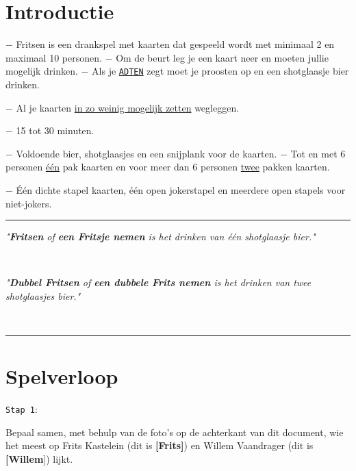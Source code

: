 \section*{Introductie}
$-$ Fritsen is een drankspel met kaarten dat gespeeld wordt met minimaal 2 en maximaal 10 personen. \newline $-$ Om de beurt leg je een kaart neer en moeten jullie mogelijk drinken. \newline $-$ Als je \ul{\texttt{ADTEN}} zegt moet je proosten op  en een shotglaasje bier drinken. 
\vspace*{-0.22cm} 

$-$ Al je kaarten \ul{in zo weinig mogelijk zetten} wegleggen.

\vspace*{-0.22cm} 

$-$ 15 tot 30 minuten.

\vspace*{-0.22cm} 

$-$ Voldoende bier, shotglaasjes en een snijplank voor de kaarten. \newline $-$ Tot en met 6 personen \ul{\'e\'en} pak kaarten en voor meer dan 6 personen \ul{twee} pakken kaarten.

\vspace*{-0.22cm} 

$-$ \'E\'en dichte stapel kaarten, \'e\'en open jokerstapel en meerdere open stapels voor niet-jokers.

\noindent\rule{\textwidth}{1pt}
\centerline{\textit{"\textbf{Fritsen} of \textbf{een Fritsje nemen} is het drinken van één shotglaasje bier."}} \\
\centerline{\textit{"\textbf{Dubbel Fritsen} of \textbf{een dubbele Frits nemen} is het drinken van twee shotglaasjes bier."}} \vspace*{-0.7cm}  \\
\noindent\rule{\textwidth}{1pt}

\vspace*{-0.45cm}

\section*{Spelverloop}
\label{sec:introductie}
\begin{minipage}[t]{.09\textwidth}
\texttt{Stap 1}:
\end{minipage}
\hfill
\begin{minipage}[t]{.91\textwidth}
Bepaal samen, met behulp van de foto's op de achterkant van dit document, wie het meest op Frits Kastelein (dit is \textbf{[Frits]}) en Willem Vaandrager (dit is \textbf{[Willem}]) lijkt. \\
\end{minipage}

